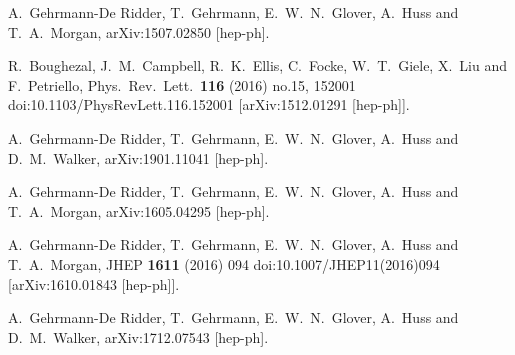 
  A.~Gehrmann-De Ridder, T.~Gehrmann, E.~W.~N.~Glover, A.~Huss and T.~A.~Morgan,
  arXiv:1507.02850 [hep-ph].

  R.~Boughezal, J.~M.~Campbell, R.~K.~Ellis, C.~Focke, W.~T.~Giele, X.~Liu and F.~Petriello,
  Phys.\ Rev.\ Lett.\  {\bf 116} (2016) no.15,  152001
  doi:10.1103/PhysRevLett.116.152001
  [arXiv:1512.01291 [hep-ph]].

  A.~Gehrmann-De Ridder, T.~Gehrmann, E.~W.~N.~Glover, A.~Huss and D.~M.~Walker,
  arXiv:1901.11041 [hep-ph].


  A.~Gehrmann-De Ridder, T.~Gehrmann, E.~W.~N.~Glover, A.~Huss and T.~A.~Morgan,
  arXiv:1605.04295 [hep-ph].


  A.~Gehrmann-De Ridder, T.~Gehrmann, E.~W.~N.~Glover, A.~Huss and T.~A.~Morgan,
  JHEP {\bf 1611} (2016) 094
  doi:10.1007/JHEP11(2016)094
  [arXiv:1610.01843 [hep-ph]].

  A.~Gehrmann-De Ridder, T.~Gehrmann, E.~W.~N.~Glover, A.~Huss and D.~M.~Walker,
  arXiv:1712.07543 [hep-ph].


